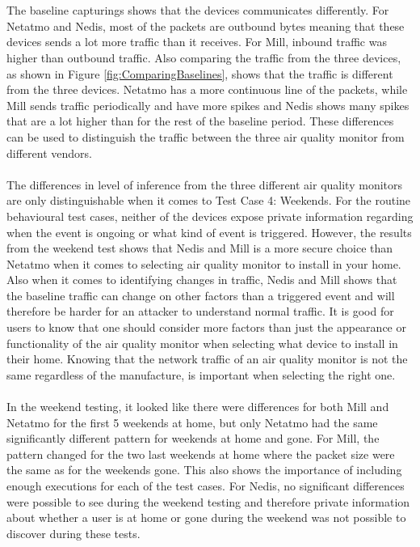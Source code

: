 \\\\
The baseline capturings shows that the devices communicates differently. For Netatmo and Nedis, 
most of the packets are outbound bytes meaning that these devices sends a lot more traffic than it receives. For Mill, inbound traffic was higher than outbound traffic. Also comparing the traffic from the three devices, as shown in Figure \ref{fig:ComparingBaselines}, shows that the traffic is different from the three devices. Netatmo has a more continuous line of the packets, while Mill sends traffic periodically and have more spikes and Nedis shows many spikes that are a lot higher than for the rest of the baseline period. These differences can be used to distinguish the traffic between the three air quality monitor from different vendors. 
\\\\
The differences in level of inference from the three different air quality monitors are only distinguishable when it comes to Test Case 4: Weekends. For the routine behavioural test cases, neither of the devices expose private information regarding when the event is ongoing or what kind of event is triggered. However, the results from the weekend test shows that Nedis and Mill is a more secure choice than Netatmo when it comes to selecting air quality monitor to install in your home. Also when it comes to identifying changes in traffic, Nedis and Mill shows that the baseline traffic can change on other factors than a triggered event and will therefore be harder for an attacker to understand normal traffic. It is good for users to know that one should consider more factors than just the appearance or functionality of the air quality monitor when selecting what device to install in their home. Knowing that the network traffic of an air quality monitor is not the same regardless of the manufacture, is important when selecting the right one. 
\\\\
In the weekend testing, it looked like there were differences for both Mill and Netatmo for the first 5 weekends at home, but only Netatmo had the same significantly different pattern for weekends at home and gone. For Mill, the pattern changed for the two last weekends at home where the packet size were the same as for the weekends gone. This also shows the importance of including enough executions for each of the test cases. For Nedis, no significant differences were possible to see during the weekend testing and therefore private information about whether a user is at home or gone during the weekend was not possible to discover during these tests. 
